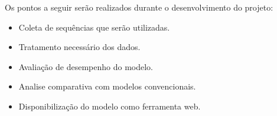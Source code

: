 Os pontos a seguir serão realizados durante o desenvolvimento do projeto:
\begin{itemize}
  \item Coleta de sequências que serão utilizadas.
  \item Tratamento necessário dos dados.
  \item Avaliação de desempenho do modelo.
  \item Analise comparativa com modelos convencionais.
  \item Disponibilização do modelo como ferramenta web.
\end{itemize}





